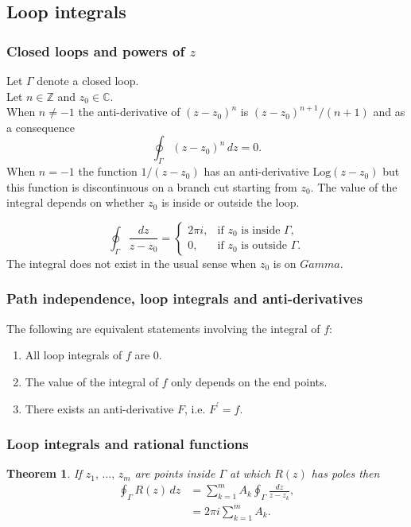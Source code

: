 \documentclass{article}
\newtheorem{theorem}{Theorem}
\begin{document}
\subsection{Loop integrals}
\subsubsection{Closed loops and powers of $z$}
Let $\Gamma$ denote a closed loop.\\
Let $n\in\mathbb{Z}$ and $z_0\in\mathbb{C}$.\\
When $n\neq -1$ the anti-derivative of $(z-z_0)^n$ is $(z-z_0)^{n+1}/(n+1)$ and as a consequence
\begin{equation}
    \oint_\Gamma (z-z_0)^n\, dz = 0.
\end{equation}
When $n=-1$ the function $1/(z-z_0)$ has an anti-derivative $\text{Log}(z-z_0)$ but this function is discontinuous on a branch cut starting from $z_0$. The value of the integral depends on whether $z_0$ is inside or outside the loop.

\[
    \oint_\Gamma\frac{dz}{z-z_0} = 
    \begin{cases}
        2\pi i, & \text{if }z_0\text{ is inside }\Gamma,\\
        0, & \text{if }z_0\text{ is outside }\Gamma.
    \end{cases}
\]
The integral does not exist in the usual sense when $z_0$ is on $Gamma$.

\subsubsection{Path independence, loop integrals and anti-derivatives}
The following are equivalent statements involving the integral of $f$:
\begin{enumerate}
    \item All loop integrals of $f$ are $0$.
    \item The value of the integral of $f$ only depends on the end points.
    \item There exists an anti-derivative $F$, i.e. $F^\prime = f$.
\end{enumerate}

\subsubsection{Loop integrals and rational functions}
\begin{theorem}
    If $z_1,\,\ldots,\,z_m$ are points inside $\Gamma$ at which $R(z)$ has poles then
    \begin{align}
        \oint_{\Gamma} R(z)\,dz &= \sum_{k=1}^m A_k\oint_{\Gamma}\frac{dz}{z-z_k}, \nonumber\\
        &= 2\pi i\sum_{k=1}^m A_k.
    \end{align}
\end{theorem}
\end{document}
